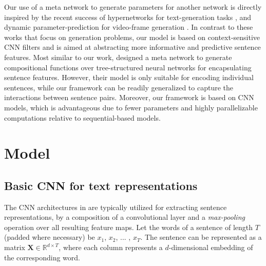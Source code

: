 \documentclass[11pt,a4paper]{article}
\begin{document}
Our use of a meta network to generate parameters for another network is directly inspired by the recent success of hypernetworks for text-generation tasks \citep{ha2016hypernetworks}, and dynamic parameter-prediction for video-frame generation \citep{de2016dynamic}. In contrast to these works that focus on generation problems, our model is based on context-sensitive CNN filters and is aimed at abstracting more informative and predictive sentence features. Most similar to our work, \citet{liu2017dynamic} designed a meta network to generate compositional functions over tree-structured neural networks for encapsulating sentence features. However, their model is only suitable for encoding individual sentences, while our framework can be readily generalized to capture the interactions between sentence pairs. Moreover, our framework is based on CNN models, which is advantageous due to fewer parameters and highly parallelizable computations relative to sequential-based models. 

\section{Model}
\subsection{Basic CNN for text representations} \label{sec:basic}

The CNN architectures in \citep{kim2014convolutional, collobert2011natural} are typically utilized for extracting sentence representations, by a composition of a convolutional layer and a \emph{max-pooling} operation over all resulting feature maps. Let the words of a sentence of length $T$ (padded where necessary) be ${x}_1$, ${x}_2$, $...$ , ${x}_T$. The sentence can be represented as a matrix $\boldsymbol{X} \in \mathbb{R}^{d \times T}$, where each column represents a $d$-dimensional embedding of the corresponding word.
\end{document}
